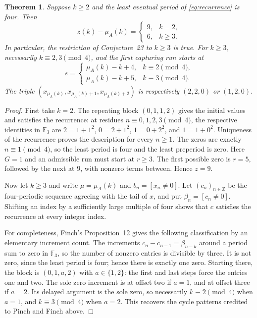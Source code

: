 \documentclass[11pt]{article}
\newtheorem{theorem}{Theorem}
\newcommand{\F}{\mathbb F_3}
\begin{document}
\begin{theorem}\label{thm:capture}
Suppose $k\ge2$ and the least eventual period of
\eqref{eq:recurrence} is four. Then
\[
z(k)-\mu_A(k)=
\begin{cases}9,&k=2,\\6,&k\ge3.\end{cases}
\]
In particular, the restriction of Conjecture~23 to $k\ge3$ is true.
For $k\ge3$, necessarily $k\equiv2,3\pmod4$, and the first
capturing run starts at
\[
s=\begin{cases}
\mu_A(k)-k+4,&k\equiv2\pmod4,\\
\mu_A(k)-k+5,&k\equiv3\pmod4.
\end{cases}
\]
The triple $(x_{\mu_A(k)},x_{\mu_A(k)+1},x_{\mu_A(k)+2})$
is respectively $(2,2,0)$ or $(1,2,0)$.
\end{theorem}
\begin{proof}
First take $k=2$.
The repeating block $(0,1,1,2)$ gives the initial values and satisfies
the recurrence: at residues $n\equiv0,1,2,3\pmod4$, the respective
identities in $\F$ are
$2=1+1^2$, $0=2+1^2$, $1=0+2^2$, and $1=1+0^2$.
Uniqueness of the recurrence proves the description for every $n\ge1$.
The zeros are exactly $n\equiv1\pmod4$, so the least period is four
and the least preperiod is zero. Here $G=1$ and an admissible run
must start at $r\ge3$. The first possible zero is $r=5$, followed
by the next at $9$, with nonzero terms between. Hence $z=9$.

Now let $k\ge3$ and write $\mu=\mu_A(k)$ and
$b_n=[x_n\ne0]$. Let $(c_n)_{n\in\mathbb Z}$ be the
four-periodic sequence agreeing with the tail of $x$, and put
$\beta_n=[c_n\ne0]$. Shifting an index by a sufficiently large
multiple of four shows that $c$ satisfies the recurrence at every
integer index.

For completeness, Finch's Proposition~12 gives the following
classification by an elementary increment count. The increments
$c_n-c_{n-1}=\beta_{n-k}$ around a period sum to zero in $\F$,
so the number of nonzero entries is divisible by three. It is not
zero, since the least period is four; hence there is exactly one
zero. Starting there, the block is $(0,1,a,2)$ with $a\in\{1,2\}$:
the first and last steps force the entries one and two. The sole
zero increment is at offset two if $a=1$, and at offset three if
$a=2$. Its delayed argument is the sole zero, so necessarily
$k\equiv2\pmod4$ when $a=1$, and $k\equiv3\pmod4$ when $a=2$.
This recovers the cycle patterns credited to Pinch and Finch above.


\end{proof}
\end{document}
